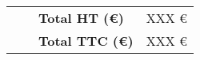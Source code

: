 \documentclass[11pt, a4paper]{awesome-cv}
\begin{document}
\begin{cvletter}
\begin{table}[h!]
    \centering
    \begin{tabular}{p{6cm} C{3cm} C{4cm} C{4cm}}
        \rule{0pt}{2.5ex} & & \textbf{Total HT (€)} & XXX € \\
        \rule{0pt}{2.5ex} & & \textbf{Total TTC (€)} & XXX €
    \end{tabular}
\end{table}

\end{cvletter}

\makeletterclosing
\end{document}
